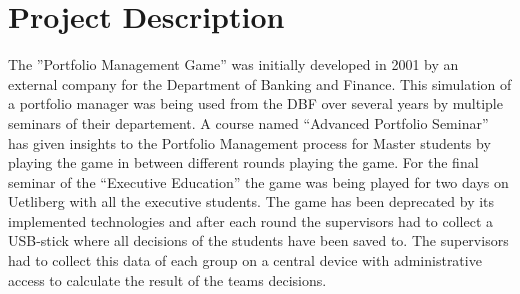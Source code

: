 \section{Project Description}
The ''Portfolio Management Game'' was initially developed in 2001 by an external company for the Department of Banking and Finance. This simulation of a portfolio manager was being used from the DBF over several years by multiple seminars of their departement. A course named “Advanced Portfolio Seminar” has given insights to the Portfolio Management process for Master students by playing the game in between different rounds playing the game. For the final seminar of the “Executive Education” the game was being played for two days on Uetliberg with all the executive students.
The game has been deprecated by its implemented technologies and after each round the supervisors had to collect a USB-stick where all decisions of the students have been saved to. The supervisors had to collect this data of each group on a central device with administrative access to calculate the result of the teams decisions.
